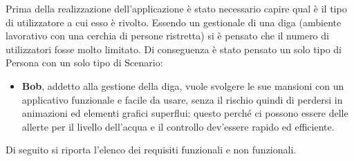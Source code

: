 \documentclass[a4paper,12pt]{report}
\begin{document}
Prima della realizzazione dell'applicazione è stato necessario capire qual è il tipo di utilizzatore a cui esso è rivolto. Essendo un gestionale di una diga (ambiente lavorativo con una cerchia di persone ristretta) si è pensato che il numero di utilizzatori fosse molto limitato. Di conseguenza è stato pensato un solo tipo di Persona con un solo tipo di Scenario:
\begin{itemize}
    \item \textbf{Bob}, addetto alla gestione della diga, vuole svolgere le sue mansioni con un applicativo funzionale e facile da usare, senza il rischio quindi di perdersi in animazioni ed elementi grafici superflui: questo perché ci possono essere delle allerte per il livello dell'acqua e il controllo dev'essere rapido ed efficiente.
\end{itemize}
Di seguito si riporta l'elenco dei requisiti funzionali e non funzionali.
\end{document}
